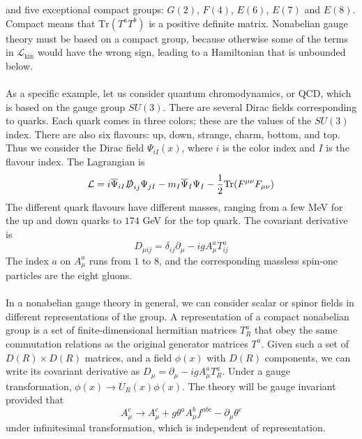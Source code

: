 and five exceptional compact groups: $G(2)$, $F(4)$, $E(6)$, $E(7)$ and $E(8)$. Compact means that $\mathrm{Tr}(T^aT^b)$ is a positive definite matrix. Nonabelian gauge theory must be based on a compact group, because otherwise some of the
terms in $\mathcal{L}_{\mathrm{kin}}$ would have the wrong sign, leading to a Hamiltonian that is unbounded below.
\\ \\
As a specific example, let us consider quantum chromodynamics, or QCD, which is based on the gauge group $SU(3)$. There are several Dirac fields corresponding to quarks. Each quark comes in three colors; these are the
values of the $SU(3)$ index. 
There are also six flavours: up, down, strange, charm, bottom, and top. Thus we consider the Dirac field $\Psi_{iI}(x)$, where $i$ is the color index and $I$ is the flavour index. The Lagrangian is
\[\mathcal{L} = i\overline{\Psi}_{iI}\slashed{D}_{ij}\Psi_{jI} - m_I\overline{\Psi}_{I}\Psi_{I} - \frac{1}{2}\mathrm{Tr}(F^{\mu\nu}F_{\mu\nu})\]
The different quark flavours have different masses, ranging from a few MeV for the up and down quarks to $174$ GeV for the top quark. The covariant derivative is
\[D_{\mu ij} = \delta_{ij}\partial_{\mu} - igA^a_{\mu}T^a_{ij}\]
The index $a$ on $A^a_{\mu}$ runs from $1$ to $8$, and the corresponding massless spin-one particles are the eight gluons.
\\ \\
In a nonabelian gauge theory in general, we can consider scalar or spinor fields in different representations of the group. A representation of a compact nonabelian group is a set of finite-dimensional hermitian matrices $T^a_{R}$ that obey the same commutation relations as the original generator matrices $T^a$. 
Given such a set of $D(R)\times D(R)$ matrices, and
a field $\phi(x)$ with $D(R)$ components, we can write its covariant derivative as $D_{\mu} = \partial_{\mu} -igA^a_{\mu}T^a_{R}$. 
Under a gauge transformation, $\phi(x) \to U_R(x)\phi(x)$. The theory will be gauge invariant provided that
\[A^c_{\mu} \to A^c_{\mu} + g\theta^aA^b_{\mu}f^{abc} - \partial_{\mu}\theta^c\]
under infinitesimal transformation, which is independent of representation.

